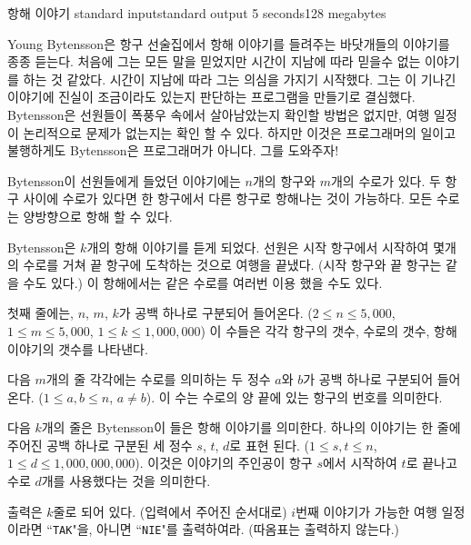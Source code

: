 \begin{problem}{항해 이야기}
	{standard input}{standard output}
	{5 seconds}{128 megabytes}{}
	
	Young Bytensson은 항구 선술집에서 항해 이야기를 들려주는 바닷개들의 이야기를 종종 듣는다. 처음에 그는 모든 말을 믿었지만 시간이 지남에 따라 믿을수 없는 이야기를 하는 것 같았다. 시간이 지남에 따라 그는 의심을 가지기 시작했다. 그는 이 기나긴 이야기에 진실이 조금이라도 있는지 판단하는 프로그램을 만들기로 결심했다. Bytensson은 선원들이 폭풍우 속에서 살아남았는지 확인할 방법은 없지만, 여행 일정이 논리적으로 문제가 없는지는 확인 할 수 있다. 하지만 이것은 프로그래머의 일이고 불행하게도 Bytensson은 프로그래머가 아니다. 그를 도와주자!
	
	Bytensson이 선원들에게 들었던 이야기에는 $n$개의 항구와 $m$개의 수로가 있다. 두 항구 사이에 수로가 있다면 한 항구에서 다른 항구로 항해나는 것이 가능하다. 모든 수로는 양방향으로 항해 할 수 있다.
	
	Bytensson은 $k$개의 항해 이야기를 듣게 되었다. 선원은 시작 항구에서 시작하여 몇개의 수로를 거쳐 끝 항구에 도착하는 것으로 여행을 끝냈다. (시작 항구와 끝 항구는 같을 수도 있다.) 이 항해에서는 같은 수로를 여러번 이용 했을 수도 있다.
	
	\InputFile
	
	첫째 줄에는, $n$, $m$, $k$가 공백 하나로 구분되어 들어온다. ($2 \le n \le 5,000$, $1 \le m \le 5,000$, $1 \le k \le 1,000,000$) 이 수들은 각각 항구의 갯수, 수로의 갯수, 항해 이야기의 갯수를 나타낸다.
	
	다음 $m$개의 줄 각각에는 수로를 의미하는 두 정수 $a$와 $b$가 공백 하나로 구분되어 들어온다. ($1 \le a, b \le n$, $a \neq b$). 이 수는 수로의 양 끝에 있는 항구의 번호를 의미한다.
	
	다음 $k$개의 줄은 Bytensson이 들은 항해 이야기를 의미한다. 하나의 이야기는 한 줄에 주어진 공백 하나로 구분된 세 정수 $s$, $t$, $d$로 표현 된다. ($1 \le s, t \le n$, $1 \le d \le 1, 000, 000, 000$). 이것은 이야기의 주인공이 항구 $s$에서 시작하여 $t$로 끝나고 수로 $d$개를 사용했다는 것을 의미한다.
	
	\OutputFile
	
	출력은 $k$줄로 되어 있다. (입력에서 주어진 순서대로) $i$번째 이야기가 가능한 여행 일정이라면 ``\texttt{TAK}"을, 아니면 ``\texttt{NIE}"를 출력하여라. (따옴표는 출력하지 않는다.) 
	
	 
	\Examples
		
	\begin{example}
	\end{example}
    
\end{problem}

